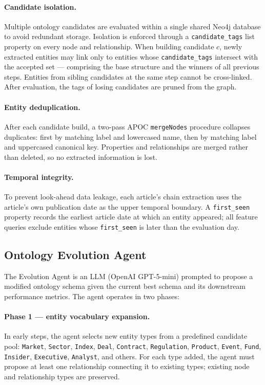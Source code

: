 \paragraph{Candidate isolation.}
Multiple ontology candidates are evaluated within a single shared Neo4j database to avoid redundant
storage.
Isolation is enforced through a \texttt{candidate\_tags} list property on every node and
relationship.
When building candidate $c$, newly extracted entities may link only to entities whose
\texttt{candidate\_tags} intersect with the accepted set --- comprising the base structure and the
winners of all previous steps.
Entities from sibling candidates at the same step cannot be cross-linked.
After evaluation, the tags of losing candidates are pruned from the graph.

\paragraph{Entity deduplication.}
After each candidate build, a two-pass APOC \texttt{mergeNodes} procedure collapses duplicates:
first by matching label and lowercased name, then by matching label and uppercased canonical key.
Properties and relationships are merged rather than deleted, so no extracted information is lost.

\paragraph{Temporal integrity.}
To prevent look-ahead data leakage, each article's chain extraction uses the article's own publication date as
the upper temporal boundary.
A \texttt{first\_seen} property records the earliest article date at which an entity appeared;
all feature queries exclude entities whose \texttt{first\_seen} is later than the evaluation day.

\subsection{Ontology Evolution Agent}
\label{sec:evolution}

The Evolution Agent is an LLM (OpenAI GPT-5-mini) prompted to propose a modified ontology schema given
the current best schema and its downstream performance metrics.
The agent operates in two phases:

\paragraph{Phase 1 --- entity vocabulary expansion.}
In early steps, the agent selects new entity types from a predefined candidate pool:
\texttt{Market}, \texttt{Sector}, \texttt{Index}, \texttt{Deal}, \texttt{Contract},
\texttt{Regulation}, \texttt{Product}, \texttt{Event}, \texttt{Fund}, \texttt{Insider},
\texttt{Executive}, \texttt{Analyst}, and others.
For each type added, the agent must propose at least one relationship
connecting it to existing types; existing node and relationship types are preserved.

